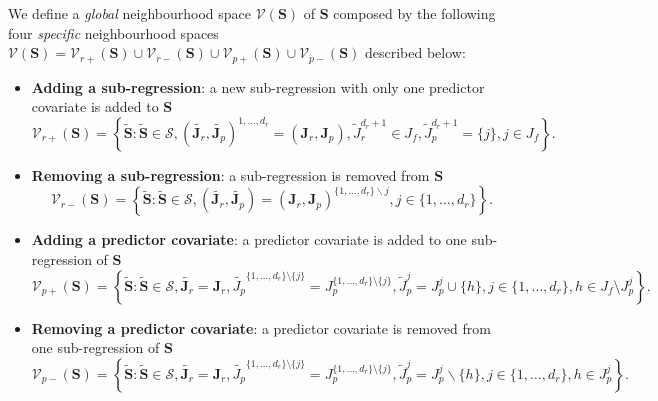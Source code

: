 \documentclass[11pt,a4paper]{article}
\begin{document}
We define a {\it global} neighbourhood space $\mathcal{V}(\boldsymbol{S})$ of $\boldsymbol{S}$ composed by the following four {\it specific} neighbourhood spaces $\mathcal{V}(\boldsymbol{S})=\mathcal{V}_{r+}(\boldsymbol{S})\cup\mathcal{V}_{r-}(\boldsymbol{S})\cup\mathcal{V}_{p+}(\boldsymbol{S})\cup\mathcal{V}_{p-}(\boldsymbol{S})$ described below:
	\begin{itemize}
	\item {\bf Adding a sub-regression}: a new sub-regression with only one predictor covariate is added to $\boldsymbol{S}$
\begin{equation}
\mathcal{V}_{r+}(\boldsymbol{S}) = \left\{\tilde{\boldsymbol{S}}: \tilde{\boldsymbol{S}}\in\mathcal{S}, (\tilde{\boldsymbol{J}_r},\tilde{\boldsymbol{J}_p})^{1,\ldots,d_r}=(\boldsymbol{J}_r,\boldsymbol{J}_p), \tilde{J}_r^{d_r+1}\in J_f, \tilde{J}_p^{d_r+1}=\{j\}, j\in J_f \right\}.
\end{equation}	
		\item {\bf Removing a sub-regression}: a sub-regression  is removed from $\boldsymbol{S}$
\begin{equation}
\mathcal{V}_{r-}(\boldsymbol{S}) = \left\{\tilde{\boldsymbol{S}}: \tilde{\boldsymbol{S}}\in\mathcal{S}, (\tilde{\boldsymbol{J}_r},\tilde{\boldsymbol{J}_p})=(\boldsymbol{J}_r,\boldsymbol{J}_p)^{\{1,\ldots,d_r\}\backslash j}, j\in\{1,\ldots,d_r\} \right\}.
\end{equation}	
	\item {\bf Adding a predictor covariate}: a predictor covariate is added to one sub-regression of $\boldsymbol{S}$
\begin{equation}
\mathcal{V}_{p+}(\boldsymbol{S}) = \left\{\tilde{\boldsymbol{S}}: \tilde{\boldsymbol{S}}\in\mathcal{S}, \tilde{\boldsymbol{J}_r}=\boldsymbol{J}_r, \tilde{J_p}^{\{1,\dots,d_r \}\setminus \{j\}}=J_p^{\{1,\dots,d_r \}\setminus \{j\}} ,\tilde{J}_p^{j}=J_p^{j} \cup \{h\}, j\in \{1,\ldots,d_r\}, h\in J_f \setminus J_p^j\right\}.
\end{equation}
	\item {\bf Removing a predictor covariate}: a predictor covariate is removed from one sub-regression of $\boldsymbol{S}$
\begin{equation}
\mathcal{V}_{p-}(\boldsymbol{S}) = \left\{\tilde{\boldsymbol{S}}: \tilde{\boldsymbol{S}}\in\mathcal{S}, \tilde{\boldsymbol{J}_r}=\boldsymbol{J}_r,\tilde{J_p}^{\{1,\dots,d_r \}\setminus \{j\}}=J_p^{\{1,\dots,d_r \}\setminus \{j\}} , \tilde{J}_p^{j}=J_p^{j} \backslash \{h\}, j\in \{1,\ldots,d_r\}, h\in  J_p^j \right\}.
\end{equation}	
	\end{itemize}
\end{document}

